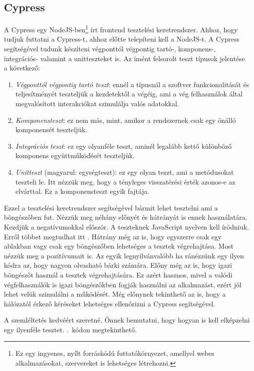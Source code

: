 \documentclass[]{thesis-ekf}
\theoremstyle{definition}
\theoremstyle{remark}
\begin{document}
	\subsection{Cypress}
		A Cypress egy NodeJS-ben\footnote{Ez egy ingyenes, nyílt forráskódú futtatókörnyezet, amellyel webes alkalmazásokat, szervereket is lehetséges létrehozni.} írt frontend tesztelési keretrendszer. Ahhoz, hogy tudjuk futtatni a Cypress-t, ahhoz előtte telepíteni kell a NodeJS-t. A Cypress segítségével tudunk készíteni végponttól végpontig tartó-, komponens-, integrációs- valamint a unitteszteket is.
		Az imént felsorolt teszt típusok jelentése a következő:
		\begin{enumerate}
			\item \emph{Végponttól végpontig tartó teszt}: ennél a típusnál a szoftver funkcionalitását és teljesítményét teszteljük a kezdetektől a végéig, ami a vég felhasználok által megvalósított interakciókat szimulálja valós adatokkal.
			\item \emph{Komponensteszt}: ez nem más, mint, amikor a rendszernek csak egy önálló komponensét teszteljük.
			\item \emph{Integrációs teszt}: ez egy olyanféle teszt, aminél legalább kettő különböző komponens együttműködését teszteljük.
			\item \emph{Unitteszt} (magyarul: egységteszt): ez egy olyan teszt, ami a metódusokat teszteli le. Itt nézzük meg, hogy a tényleges visszatérési érték azonos-e az elvárttal. Ez a komponensteszt egyik fajtája.
		\end{enumerate}
		Ezzel a tesztelési keretrendszer segítségével bármit lehet tesztelni ami a böngészőben fut. Nézzük meg néhány előnyét és hátrányát is ennek használatára. Kezdjük a negatívumokkal először. A teszteknek JavaScript nyelven kell íródniuk. Erről többet megtudhat itt . Hátrány még az is, hogy egyszerre csak egy ablakban vagy csak egy böngészőben lehetséges a tesztek végrehajtása. Most nézzük meg a pozitívumait is. Az egyik legnyilvánvalóbb ha ránézzünk egy ilyen kódra az, hogy nagyon olvasható bárki számára. Előny még az is, hogy igazi böngészőt használ a tesztek végrehajtására. Ez azért hasznos, mivel a valódi végfelhasználók is igazi böngészőkben fogják használni az alkalmazást, ezért jól lehet velük szimulálni a működését. Még előnynek tekinthető az is, hogy a hálózatól érkező kéréseket lehetséges ellenőrizni a Cypress segítségével.
		\cite{Kusper Szoftvertesztles, Cypress, Katalon, Medium, NodeJS}
		
		A szemléltetés kedvéért szeretné, Önnek bemutatni, hogy hogyan is kell elképzelni egy ilyenféle tesztet. .~kódon megtekinthető.
		
\end{document}
